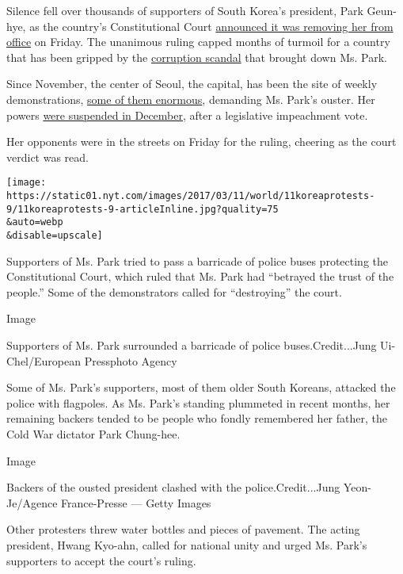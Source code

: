 Silence fell over thousands of supporters of South Korea's president,
Park Geun-hye, as the country's Constitutional Court
\href{https://www.nytimes.com/2017/03/09/world/asia/park-geun-hye-impeached-south-korea.html?hp\&action=click\&pgtype=Homepage\&clickSource=story-heading\&module=first-column-region\&region=top-news\&WT.nav=top-news}{announced
it was removing her from office} on Friday. The unanimous ruling capped
months of turmoil for a country that has been gripped by the
\href{https://www.nytimes.com/2016/12/09/world/asia/south-korea-president-park-geun-hye-impeached.html}{corruption
scandal} that brought down Ms. Park.

Since November, the center of Seoul, the capital, has been the site of
weekly demonstrations,
\href{https://www.nytimes.com/2016/11/26/world/asia/korea-park-geun-hye-protests.html}{some
of them enormous}, demanding Ms. Park's ouster. Her powers
\href{https://www.nytimes.com/2016/12/09/world/asia/south-korea-president-park-geun-hye-impeached.html}{were
suspended in December}, after a legislative impeachment vote.

Her opponents were in the streets on Friday for the ruling, cheering as
the court verdict was read.

\texttt{[image: https://static01.nyt.com/images/2017/03/11/world/11koreaprotests-9/11koreaprotests-9-articleInline.jpg?quality=75\\\&auto=webp\\\&disable=upscale]}

Supporters of Ms. Park tried to pass a barricade of police buses
protecting the Constitutional Court, which ruled that Ms. Park had
``betrayed the trust of the people.'' Some of the demonstrators called
for ``destroying'' the court.

Image

Supporters of Ms. Park surrounded a barricade of police
buses.Credit...Jung Ui-Chel/European Pressphoto Agency

Some of Ms. Park's supporters, most of them older South Koreans,
attacked the police with flagpoles. As Ms. Park's standing plummeted in
recent months, her remaining backers tended to be people who fondly
remembered her father, the Cold War dictator Park Chung-hee.

Image

Backers of the ousted president clashed with the police.Credit...Jung
Yeon-Je/Agence France-Presse --- Getty Images

Other protesters threw water bottles and pieces of pavement. The acting
president, Hwang Kyo-ahn, called for national unity and urged Ms. Park's
supporters to accept the court's ruling.

